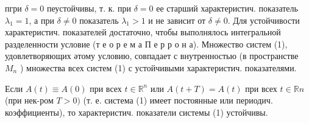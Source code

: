 \documentclass[10pt]{article}
\begin{document}
пгри $\delta=0$ пеустойчивы, т. к. при $\delta=0$ ее старший характеристич. показатель $\lambda_{1}=1$, а при $\delta \neq 0$ показатель $\lambda_{1}>1$ и не зависит от $\delta \neq 0$. Для устойчивости характеристич. показателей достаточно, чтобы выполнялось интегральной разделенности условие (т е о р е м а П е р р о н а). Множество систем (1), удовлетворяющих әтому условию, совпадает с внутренностью (в пространстве $M_{n}$ ) множества всех систем (1) с устойчивыми характеристич. показателями.



Если $A(t) \equiv A(0)$ при всех $t \in \mathbb{R}^{n}$ или $A(t+T)=A(t)$ при всех $t \in \mathbb{R} n$ (при нек-ром $T>0)$ (т. е. система (1) имеет постоянные или периодич. коэффициенты), то характеристич. показатели системы (1) устойчивы.
\end{document}
